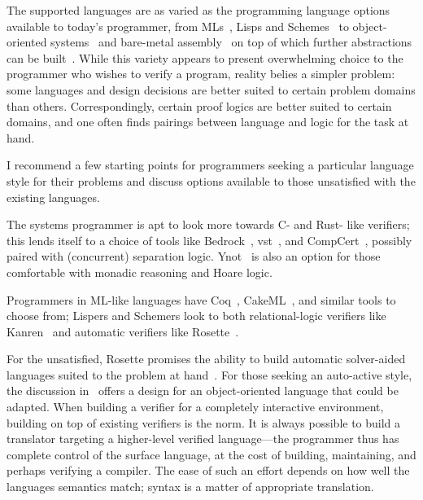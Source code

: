 The supported languages are as varied as the programming language options
available to today's programmer, from MLs~\cite{Coq,Kumar_2014}, Lisps and
Schemes~\cite{Torlak_2013} to object-oriented
systems~\cite{leino2008specification,leino2010dafny} and bare-metal
assembly~\cite{Chlipala_2011} on top of which further abstractions can be
built~\cite{Chlipala_2015}. While this variety appears to present overwhelming
choice to the programmer who wishes to verify a program, reality belies a
simpler problem: some languages and design decisions are better suited to
certain problem domains than others. Correspondingly, certain proof logics are
better suited to certain domains, and one often finds pairings between language
and logic for the task at hand.

I recommend a few starting points for programmers seeking a particular language
style for their problems and discuss options available to those unsatisfied with
the existing languages.

The systems programmer is apt to look more towards C- and Rust- like verifiers; this
lends itself to a choice of tools like Bedrock~\cite{Chlipala_2011},
\gls{vst}~\cite{VST}, and CompCert~\cite{Kastner-LBSSF-2017}, possibly paired
with (concurrent) separation logic. Ynot~\cite{Nanevski08ynot:reasoning} is also
an option for those comfortable with monadic reasoning and Hoare logic.

Programmers in ML-like languages have Coq~\cite{Coq}, CakeML~\cite{Kumar_2014},
and similar tools to choose from; Lispers and Schemers look to both
relational-logic verifiers like Kanren~\cite{Byrd_2009} and automatic verifiers
like Rosette~\cite{Rosette}.

For the unsatisfied, Rosette promises the ability to build automatic
solver-aided languages suited to the problem at hand~\cite{Torlak_2013}. For
those seeking an auto-active style, the discussion
in~\cite{leino2008specification} offers a design for an object-oriented language
that could be adapted. When building a verifier for a completely interactive
environment, building on top of existing verifiers is the norm. It is always
possible to build a translator targeting a higher-level verified language---the
programmer thus has complete control of the surface language, at the cost of
building, maintaining, and perhaps verifying a compiler. The ease of such an
effort depends on how well the languages semantics match; syntax is a matter of
appropriate translation.

